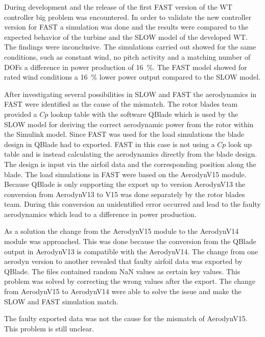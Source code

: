 During development and the release of the first \gls{FAST} version of the \gls{WT} controller big problem was encountered.
In order to validate the new controller version for \gls{FAST} a simulation was done and the results were compared to the expected behavior of the turbine and the \gls{SLOW} model of the developed \gls{WT}.
The findings were inconclusive.
The simulations carried out showed for the same conditions, such as constant wind, no pitch activity and a matching number of DOFs a difference in power production of \SI{16}{\%}.
The \gls{FAST} model showed for rated wind conditions a \SI{16}{\%} lower power output compared to the \gls{SLOW} model.

After investigating several possibilities in \gls{SLOW} and \gls{FAST} the aerodynamics in \gls{FAST} were identified as the cause of the mismatch.
The rotor blades team provided a $Cp$ lookup table with the software QBlade which is used by the \gls{SLOW} model for deriving the correct aerodynamic power from the rotor within the Simulink model.
Since \gls{FAST} was used for the load simulations the blade design in QBlade had to exported. \gls{FAST} in this case is not using a $Cp$ look up table and is instead calculating the aerodynamics directly from the blade design.
The design is input via the airfoil data and the corresponding position along the blade.
The load simulations in FAST were based on the AerodynV15 module.
Because QBlade is only supporting the export up to version AerodynV13 the conversion from AerodynV13 to V15 was done separately by the rotor blades team.
During this conversion an unidentified error occurred and lead to the faulty aerodynamics which lead to a difference in power production.

As a solution the change from the AerodynV15 module to the AerodynV14 module was approached.
This was done because the conversion from the QBlade output in AerodynV13 is compatible with the AerodynV14.
The change from one aerodyn version to another revealed that faulty airfoil data was exported by QBlade.
The files contained random NaN values as certain key values.
This problem was solved by correcting the wrong values after the export.
The change from AerodynV15 to AerodynV14 were able to solve the issue and make the \gls{SLOW} and \gls{FAST} simulation match.

The faulty exported data was not the cause for the mismatch of AerodynV15. This problem is still unclear. 

